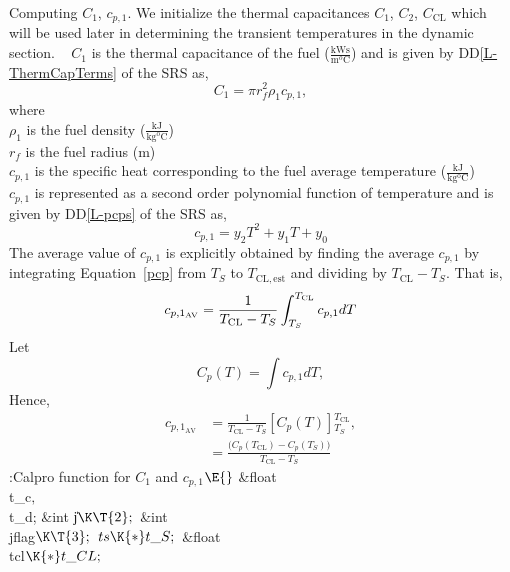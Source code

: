 \documentclass[letterpaper,12pt,baseclass=report]{cweb-hy}
\begin{document}
{Computing $C_1$, $c_{p,1}$. \label{c1cp1}
We initialize the thermal capacitances $C_1$, $C_2$, $C_{\mathrm{CL}}$ which
will be used
later in determining the transient temperatures in the dynamic section.
~\newline
$C_1$ is the thermal capacitance of the
fuel ($\frac{\mathrm{kW}\text{s}}{\text{m}^o\text{C}}$) and is given by
DD\ref{L-ThermCapTerms} of the SRS as,
\begin{equation}
C_{1} =\pi r_f^2 \rho_1 c_{p,1}, \label{eq:C_1}
\end{equation}
\noindent where
\\$\rho_1$ is the fuel density ($\mathrm{\frac{kJ}{kg^oC}}$)\\
$r_f$ is the fuel radius ($\text{m}$)\\
$c_{p,1}$ is the specific heat corresponding to the fuel average
temperature ($\mathrm{\frac{kJ}{kg^oC}}$)\\
$c_{p,1}$ is represented as a second order
polynomial function of temperature and is
given by DD\ref{L-pcps} of the SRS as,
\begin{equation}
c_{p,1} =y_2 T^2 + y_1 T + y_0 \label{pcp}
\end{equation}
The average value of $c_{p,1}$ is explicitly obtained by finding the average
$c_{p,1}$ by
integrating Equation~\ref{pcp} from $T_S$ to $T_{\mathrm{CL,est}}$ and dividing
by
$T_{\text{CL}}-T_S$. That is,
\begin{equation}
c_{p,1_{\text{AV}}} = \frac{1}{T_{\text{CL}}-T_S}\int_{T_S}^{T_%
\text{CL}}c_{p,1}dT
\label{eq:cp1}
\end{equation}
Let
\begin{equation}
C_p(T)=\int c_{p,1}dT,
\end{equation}
Hence,
\begin{align}
c_{p,1_{\text{AV}}}&=\frac{1}{ T_{\mathrm{CL}}-T_S}\displaystyle{[C_p(T)]}%
\scriptstyle
{^{T_{\mathrm{CL}}}
_{T_S}},\label{eq:cp}\\
&=\frac{\bigl(C_p(T_{\mathrm{CL}})-C_p(T_S)\bigr)}{ T_{\mathrm{CL}}-T_S}
\end{align}
\Y\B\4:Calpro function for $C_{1}$ and $c_{p,1}$\X${}\E{}$\6
\&{float} \\{t\_c}${},{}$ \\{t\_d};\6
\&{int} \|j${}\K\T{2};{}$\6
\&{int} \\{jflag}${}\K\T{3};{}$\7
${}\\{ts}\K{*}\\{t\_S};{}$\7
\&{float} \\{tcl}${}\K{*}\\{t\_CL};{}$\7
}
\end{document}
